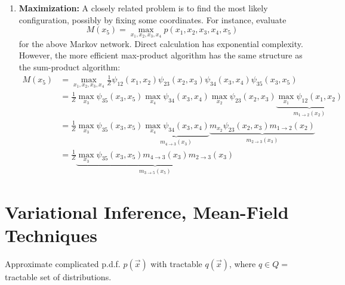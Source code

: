 \documentclass[11pt,a4paper]{article}
\begin{document}
\begin{enumerate}
    \item \textbf{Maximization:} A closely related problem is to find the most likely configuration, possibly by fixing some coordinates. For instance, evaluate
    $$
    M\left(x_5\right)=\max _{x_1, x_2, x_3, x_4} p\left(x_1, x_2, x_3, x_4, x_5\right)
    $$
    for the above Markov network. Direct calculation has exponential complexity. However, the more efficient max-product algorithm has the same structure as the sum-product algorithm:
    \begin{equation}
        \begin{aligned}
            M\left(x_5\right)&=\max _{x_1, x_2, x_3, x_4} \frac{1}{Z} \psi_{12}\left(x_1, x_2\right) \psi_{23}\left(x_2, x_3\right) \psi_{34}\left(x_3, x_4\right) \psi_{35}\left(x_3, x_5\right)\\
            &=\frac{1}{Z} \max _{x_3} \psi_{35}\left(x_3, x_5\right) \max _{x_4} \psi_{34}\left(x_3, x_4\right) \max _{x_2} \psi_{23}\left(x_2, x_3\right) \underbrace{\max _{x_1} \psi_{12}\left(x_1, x_2\right)}_{m_{1 \rightarrow 2}\left(x_2\right)}\\
            &=\frac{1}{Z} \max _{x_3} \psi_{35}\left(x_3, x_5\right) \underbrace{\max _{x_4} \psi_{34}\left(x_3, x_4\right)}_{m_{4 \rightarrow 3}\left(x_3\right)} \underbrace{m_{x_2} \psi_{23}\left(x_2, x_3\right) m_{1 \rightarrow 2}\left(x_2\right)}_{m_{2 \rightarrow 3}\left(x_3\right)}\\
            &=\frac{1}{Z} \underbrace{\max _{x_3} \psi_{35}\left(x_3, x_5\right) m_{4 \rightarrow 3}\left(x_3\right) m_{2 \rightarrow 3}\left(x_3\right)}_{m_{3 \rightarrow 5}\left(x_5\right)}
        \end{aligned}
        \nonumber
    \end{equation}
\end{enumerate}




















\section{Variational Inference, Mean-Field Techniques}
Approximate complicated p.d.f. $p(\vec{x})$ with tractable $q(\vec{x})$, where $q\in Q=$ tractable set of distributions.
\end{document}
